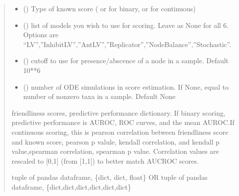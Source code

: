 \documentclass[letterpaper,10pt,english]{sphinxmanual}
\begin{document}
\begin{fulllineitems}
\begin{quote}
\begin{description}
\begin{itemize}
\item {} 
\sphinxAtStartPar
{} () \textendash{} Type of known score ( or  for binary,  or  for continuous)

\item {} 
\sphinxAtStartPar
{} () \textendash{} list of models you wish to use for scoring. Leave as None for all 6. Options are “LV”,”InhibitLV”,”AntLV”,”Replicator”,”NodeBalance”,”Stochastic”.

\item {} 
\sphinxAtStartPar
{} () \textendash{} cutoff to use for presence/abscence of a node in a sample. Default 10**\sphinxhyphen{}6

\item {} 
\sphinxAtStartPar
{} () \textendash{} number of ODE simulations in score estimation. If None, equal to number of non\sphinxhyphen{}zero taxa in a sample. Default None

\end{itemize}

\sphinxAtStartPar
friendliness scores, predictive performance dictionary. If binary scoring, predictive performance is AUROC, ROC curves, and the mean AUROC.If continuous scoring, this is pearson correlation between friendliness score and known score, pearson p valule, kendall correlation, and kendall p value,spearman correlation, spearman p value. Correlation values are rescaled to {[}0,1{]} (from {[}\sphinxhyphen{}1,1{]}) to better match AUCROC scores.

\sphinxAtStartPar
tuple of pandas dataframe, \{dict, dict, float\} OR tuple of pandas dataframe, \{dict,dict,dict,dict,dict,dict\}

\end{description}\end{quote}

\end{fulllineitems}

\end{document}
